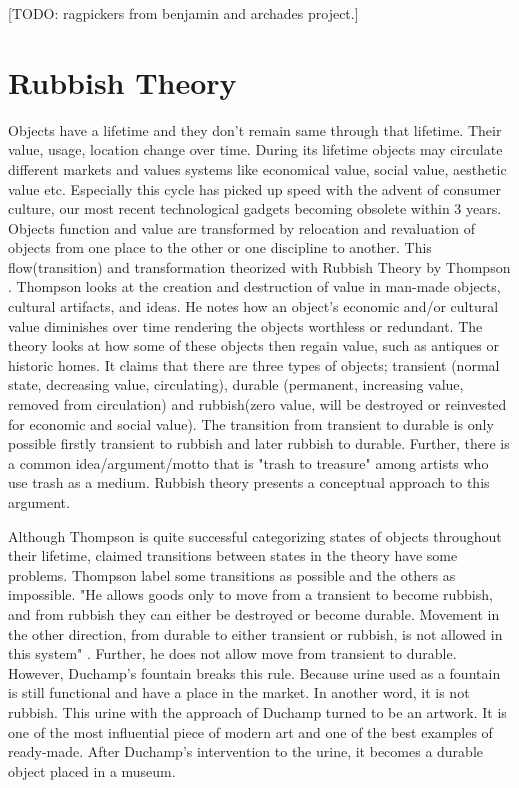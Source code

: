 [TODO: ragpickers from benjamin and archades project.]

\section{Rubbish Theory}
Objects have a lifetime and they don't remain same through that lifetime. Their value, usage, location change over time. During its lifetime objects may circulate different markets and values systems like economical value, social value, aesthetic value etc. Especially this cycle has picked up speed with the advent of consumer culture, our most recent technological gadgets becoming obsolete within 3 years. Objects function and value are transformed by relocation and revaluation of objects from one place to the other or one discipline to another. This flow(transition) and transformation theorized with Rubbish Theory by Thompson \cite{thompson1979rubbish}. Thompson looks at the creation and destruction of value in man-made objects, cultural artifacts, and ideas. He notes how an object’s economic and/or cultural value diminishes over time rendering the objects worthless or redundant. The theory looks at how some of these objects then regain value, such as antiques or historic homes. It claims that there are three types of objects; transient (normal state, decreasing value, circulating), durable (permanent, increasing value, removed from circulation) and rubbish(zero value, will be destroyed or reinvested for economic and social value). The transition from transient to durable is only possible firstly transient to rubbish and later rubbish to durable. Further, there is a common idea/argument/motto that is "trash to treasure" among artists who use trash as a medium. Rubbish theory presents a conceptual approach to this argument. 

Although Thompson is quite successful categorizing states of objects throughout their lifetime, claimed transitions between states in the theory have some problems. Thompson label some transitions as possible and the others as impossible. "He allows goods only to move from a transient to become rubbish, and from rubbish they can either be destroyed or become durable. Movement in the other direction, from durable to either transient or rubbish, is not allowed in this system" \cite{meadow2011relocation}. Further, he does not allow move from transient to durable. However, Duchamp's fountain breaks this rule. Because urine used as a fountain is still functional and have a place in the market. In another word, it is not rubbish. This urine with the approach of Duchamp turned to be an artwork. It is one of the most influential piece of modern art and one of the best examples of ready-made. After Duchamp's intervention to the urine, it becomes a durable object placed in a museum.

